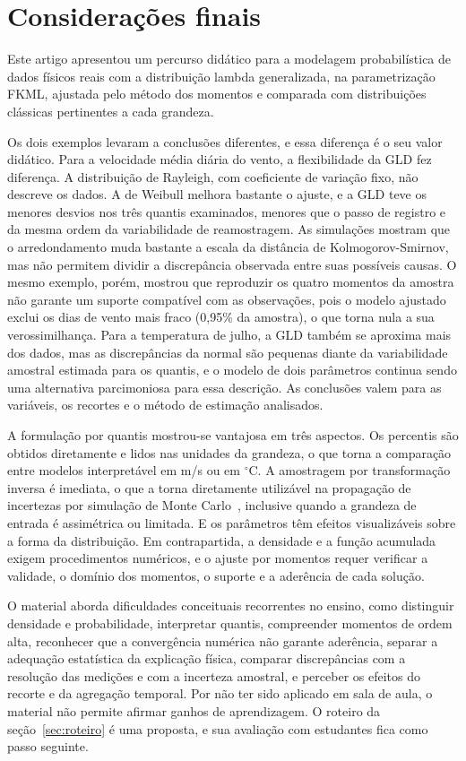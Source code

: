 \section{Considerações finais}\label{sec:consideracoes}

Este artigo apresentou um percurso didático para a modelagem probabilística de dados físicos reais com a distribuição lambda generalizada, na parametrização FKML, ajustada pelo método dos momentos e comparada com distribuições clássicas pertinentes a cada grandeza.

Os dois exemplos levaram a conclusões diferentes, e essa diferença é o seu valor didático. Para a velocidade média diária do vento, a flexibilidade da GLD fez diferença. A distribuição de Rayleigh, com coeficiente de variação fixo, não descreve os dados. A de Weibull melhora bastante o ajuste, e a GLD teve os menores desvios nos três quantis examinados, menores que o passo de registro e da mesma ordem da variabilidade de reamostragem. As simulações mostram que o arredondamento muda bastante a escala da distância de Kolmogorov-Smirnov, mas não permitem dividir a discrepância observada entre suas possíveis causas. O mesmo exemplo, porém, mostrou que reproduzir os quatro momentos da amostra não garante um suporte compatível com as observações, pois o modelo ajustado exclui os dias de vento mais fraco (0,95\% da amostra), o que torna nula a sua verossimilhança. Para a temperatura de julho, a GLD também se aproxima mais dos dados, mas as discrepâncias da normal são pequenas diante da variabilidade amostral estimada para os quantis, e o modelo de dois parâmetros continua sendo uma alternativa parcimoniosa para essa descrição. As conclusões valem para as variáveis, os recortes e o método de estimação analisados.

A formulação por quantis mostrou-se vantajosa em três aspectos. Os percentis são obtidos diretamente e lidos nas unidades da grandeza, o que torna a comparação entre modelos interpretável em m/s ou em $^\circ$C. A amostragem por transformação inversa é imediata, o que a torna diretamente utilizável na propagação de incertezas por simulação de Monte Carlo~\cite{gums1}, inclusive quando a grandeza de entrada é assimétrica ou limitada. E os parâmetros têm efeitos visualizáveis sobre a forma da distribuição. Em contrapartida, a densidade e a função acumulada exigem procedimentos numéricos, e o ajuste por momentos requer verificar a validade, o domínio dos momentos, o suporte e a aderência de cada solução.

O material aborda dificuldades conceituais recorrentes no ensino, como distinguir densidade e probabilidade, interpretar quantis, compreender momentos de ordem alta, reconhecer que a convergência numérica não garante aderência, separar a adequação estatística da explicação física, comparar discrepâncias com a resolução das medições e com a incerteza amostral, e perceber os efeitos do recorte e da agregação temporal. Por não ter sido aplicado em sala de aula, o material não permite afirmar ganhos de aprendizagem. O roteiro da seção~\ref{sec:roteiro} é uma proposta, e sua avaliação com estudantes fica como passo seguinte.

